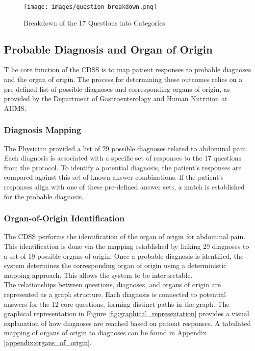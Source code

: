 \begin{figure}[h]
    \centering
    \texttt{[image: images/question\_breakdown.png]}
    \caption{Breakdown of the 17 Questions into Categories}
    \label{fig:question_breakdown}
\end{figure}

\subsection{Probable Diagnosis and Organ of Origin}
\lettrine{T}{ }he core function of the CDSS is to map patient responses to probable diagnoses and the organ of origin. The process for determining these outcomes relies on a pre-defined list of possible diagnoses and corresponding organs of origin, as provided by the Department of Gastroenterology and Human Nutrition at AIIMS.
\subsubsection{Diagnosis Mapping}
The Physician provided a list of 29 possible diagnoses related to abdominal pain. Each diagnosis is associated with a specific set of responses to the 17 questions from the protocol. To identify a potential diagnosis, the patient's responses are compared against this set of known answer combinations. If the patient's responses align with one of these pre-defined answer sets, a match is established for the probable diagnosis.
\subsubsection{Organ-of-Origin Identification}
The CDSS performs the identification of the organ of origin for abdominal pain. This identification is done via the mapping established by linking 29 diagnoses to a set of 19 possible organs of origin. Once a probable diagnosis is identified, the system determines the corresponding organ of origin using a \textcolor{TUMBlue}{deterministic mapping} approach. This allows the system to be interpretable.\\[\baselineskip]

\noindent The relationships between questions, diagnoses, and organs of origin are represented as a graph structure. Each diagnosis is connected to potential answers for the 12 core questions, forming distinct paths in the graph. The graphical representation in Figure \ref{fig:graphical_representation} provides a visual explanation of how diagnoses are reached based on patient responses. A tabulated mapping of organs of origin to diagnoses can be found in Appendix \ref{appendix:organs_of_origin}.\\[\baselineskip]

